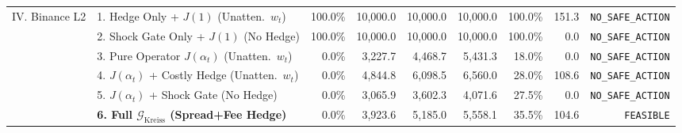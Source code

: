 \begin{table}[htbp]
{\begin{tabular}{llrrrrrrr}
\midrule
IV. Binance L2 & 1. Hedge Only + $J(1)$ (Unatten.\ $w_t$) & 100.0\% & 10,000.0 & 10,000.0 & 10,000.0 & 100.0\% & 151.3 & \texttt{NO\_SAFE\_ACTION} \\
 & 2. Shock Gate Only + $J(1)$ (No Hedge) & 100.0\% & 10,000.0 & 10,000.0 & 10,000.0 & 100.0\% & 0.0 & \texttt{NO\_SAFE\_ACTION} \\
 & 3. Pure Operator $J(\alpha_t)$ (Unatten.\ $w_t$) & 0.0\% & 3,227.7 & 4,468.7 & 5,431.3 & 18.0\% & 0.0 & \texttt{NO\_SAFE\_ACTION} \\
 & 4. $J(\alpha_t)$ + Costly Hedge (Unatten.\ $w_t$) & 0.0\% & 4,844.8 & 6,098.5 & 6,560.0 & 28.0\% & 108.6 & \texttt{NO\_SAFE\_ACTION} \\
 & 5. $J(\alpha_t)$ + Shock Gate (No Hedge) & 0.0\% & 3,065.9 & 3,602.3 & 4,071.6 & 27.5\% & 0.0 & \texttt{NO\_SAFE\_ACTION} \\
 & \textbf{6. Full $\mathcal{G}_{\mathrm{Kreiss}}$ (Spread+Fee Hedge)} & 0.0\% & 3,923.6 & 5,185.0 & 5,558.1 & 35.5\% & 104.6 & \texttt{FEASIBLE} \\
\bottomrule
\end{tabular}%
}
\end{table}
